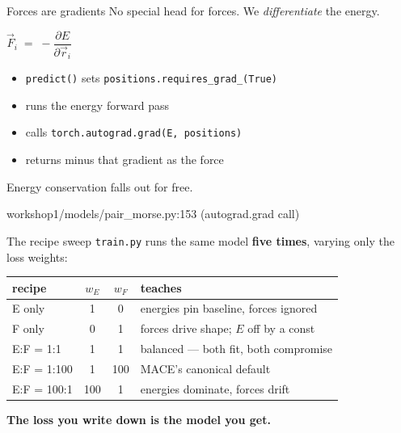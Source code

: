 \documentclass[aspectratio=169,11pt]{beamer}
\newcommand{\srcref}[1]{{\color{muted}\ttfamily\footnotesize #1}}
\begin{document}
\begin{frame}{Forces are gradients}
  No special head for forces. We \emph{differentiate} the energy.

  \vspace{0.6em}
  \begin{center}
    \large $\vec{F}_i \;=\; -\dfrac{\partial E}{\partial \vec{r}_i}$
  \end{center}

  \vspace{0.6em}
  \begin{itemize}
    \item \texttt{predict()} sets \texttt{positions.requires\_grad\_(True)}
    \item runs the energy forward pass
    \item calls \texttt{torch.autograd.grad(E, positions)}
    \item returns minus that gradient as the force
  \end{itemize}

  \vspace{0.4em}
  Energy conservation falls out for free.

  \vspace{0.6em}
  \srcref{workshop1/models/pair\_morse.py:153  (autograd.grad call)}
\end{frame}

\begin{frame}{The recipe sweep}
  \texttt{train.py} runs the same model \textbf{five times}, varying only
  the loss weights:

  \vspace{0.6em}
  \centering
  \small
  \begin{tabular}{lccl}
    \toprule
    recipe & $w_E$ & $w_F$ & teaches \\
    \midrule
    E only        & 1   & 0   & energies pin baseline, forces ignored \\
    F only        & 0   & 1   & forces drive shape; $E$ off by a const \\
    E:F = 1:1     & 1   & 1   & balanced --- both fit, both compromise \\
    E:F = 1:100   & 1   & 100 & MACE's canonical default \\
    E:F = 100:1   & 100 & 1   & energies dominate, forces drift \\
    \bottomrule
  \end{tabular}

  \vspace{0.8em}
  \centering
  \textbf{The loss you write down is the model you get.}
\end{frame}
\end{document}

